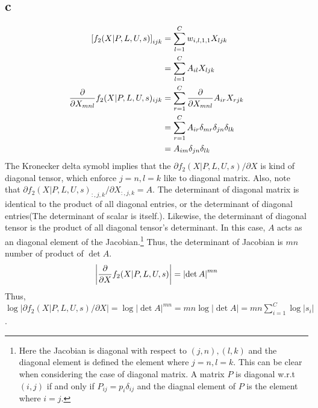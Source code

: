 \documentclass[10pt]{article}
\begin{document}
\subsection*{c}
\begin{align*}
    \left[f_2(X|P,L,U,s)\right]_{ijk} &= \sum_{l=1}^C w_{i,l,1,1}X_{ljk} \\
    &= \sum_{l=1}^{C}A_{il}X_{ljk} \\
    {\partial \over \partial X_{mnl}} f_2(X|P,L,U,s)_{ijk} &= \sum_{r=1}^C {\partial \over \partial X_{mnl}} A_{ir}X_{rjk} \\
    &= \sum_{r=1}^C A_{ir}\delta_{mr}\delta_{jn}\delta_{lk} \\
    &= A_{im}\delta_{jn}\delta_{lk}
\end{align*}
The Kronecker delta symobl implies that the ${\partial f_2(X|P,L,U,s)}/ \partial X$ is kind of diagonal tensor, which enforce $j = n, l = k$ like to diagonal matrix. 
Also, note that ${\partial f_2(X|P,L,U,s)_{:,j,k}}/ \partial X_{:,j,k} = A$.
The determinant of diagonal matrix is identical to the product of all diagonal entries, or the determinant of diagonal entries(The determinant of scalar is itself.).
Likewise, the determinant of diagonal tensor is the product of all diagonal tensor's determinant.  
In this case, $A$ acts as an diagonal element of the Jacobian.\footnote{Here the Jacobian is diagonal with respect to $(j,n), (l,k)$ and the diagonal element is defined the element where $j = n, l = k$. This can be clear when considering the case of diagonal matrix. A matrix $P$ is diagonal w.r.t $(i,j)$ if and only if $P_{ij} = p_i\delta_{ij}$ and the diagnal element of $P$ is the element where $i=j$.}
Thus, the determinant of Jacobian is $mn$ number of product of $\det A$.
\begin{equation}
    \left|{\partial \over \partial X} f_2(X|P,L,U,s)\right|  = \left|\det A\right|^{mn}
\end{equation}
Thus, $ \log \left|{\partial f_2(X|P,L,U,s) / \partial X} \right| = \log  \left|\det A\right|^{mn} = mn \log \left|\det A\right| = mn \sum_{i=1}^C\log|s_i|$.
\end{document}
